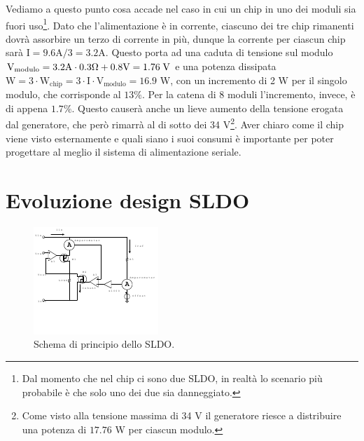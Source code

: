 Vediamo a questo punto cosa accade nel caso in cui un chip in uno dei moduli sia fuori uso\footnote{Dal momento che nel chip ci sono due SLDO, in realtà lo scenario più probabile è che solo uno dei due sia danneggiato.}.
Dato che l'alimentazione è in corrente, ciascuno dei tre chip rimanenti dovrà assorbire un terzo di corrente in più, dunque la corrente per ciascun chip sarà $\mathrm{I = 9.6A / 3 = 3.2 A}$. 
Questo porta ad una caduta di tensione sul modulo $\mathrm{V_{modulo} = 3.2 A \cdot 0.3 \Omega + 0.8 V = 1.76 \rm \; V}$ e una potenza dissipata $\mathrm{W = 3 \cdot W_{chip} = 3 \cdot I \cdot V_{modulo} = 16.9}$ W, con un incremento di 2 W per il singolo modulo, che corrisponde al $13 \%$. Per la catena di 8 moduli l'incremento, invece, è di appena $1.7\%$. 
Questo causerà anche un lieve aumento della tensione erogata dal generatore, che però rimarrà al di sotto dei 34 V\footnote{Come visto alla tensione massima di  34 V il generatore riesce a distribuire una potenza di $17.76$ W per ciascun modulo.}.
Aver chiaro come il chip viene visto esternamente e quali siano i suoi consumi è importante per poter progettare al meglio il sistema di alimentazione seriale.

\section{Evoluzione design SLDO}
\begin{figure}
\centering
\includegraphics[scale=3.5]{Immagini/SLDObase}
\caption{Schema di principio dello SLDO.}
\label{SLDOprova}
\end{figure}

